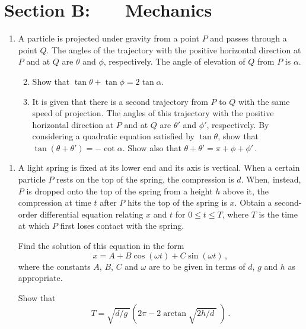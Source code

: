 \documentclass[a4, 11pt]{report}
\newlength{\qspace}
\newcounter{qnumber}
\newenvironment{question}%
 {\vspace{\qspace}
  \begin{enumerate}[\bfseries 1\quad][10]%
    \setcounter{enumi}{\value{qnumber}}%
    \item%
 }
{
  \end{enumerate}
  \filbreak
  \stepcounter{qnumber}
 }
\newenvironment{questionparts}[1][1]%
 {
  \begin{enumerate}[\bfseries (i)]%
    \setcounter{enumii}{#1}
    \addtocounter{enumii}{-1}
    \setlength{\itemsep}{5mm}
    \setlength{\parskip}{8pt}
 }
 {
  \end{enumerate}
 }
\def\le{\leqslant}
\begin{document}
		
	
\newpage
\section*{Section B: \ \ \ Mechanics}


	
\begin{question}
A particle is projected under gravity from a point $P$ and passes
through a point $Q$. The angles of the trajectory with the positive
horizontal direction at $P$ and at $Q$ are $\theta$ and $\phi$,
respectively. The angle of elevation   of $Q$ from $P$ is $\alpha$.

\begin{questionparts}
\item Show that $\tan\theta +\tan\phi = 2\tan\alpha$.

\item It is given that there is a second trajectory from $P$ to $Q$
with the same speed of projection.
The angles of this trajectory with the positive
 horizontal direction at $P$ and at $Q$ are $\theta'$ and $\phi'$,
 respectively.
By considering a quadratic
equation satisfied by $\tan\theta$,
show that  $\tan(\theta+\theta') = -\cot\alpha$.
Show also that $\theta+\theta'=\pi+\phi+\phi'\,$.
\end{questionparts}
	\end{question}
	
\begin{question}
A light spring is fixed at its lower end and its axis is
vertical. When  a certain particle $P$ rests on the top of the 
spring, the compression is $d$. When, instead, $P$ is dropped onto the 
top of the spring from a
height $h$ above it, the compression at time $t$ after $P$ hits the
top of the spring is $x$. Obtain    a second-order differential
equation relating $x$ and $t$ for $0\le t \le T$, where $T$ is the time
at which $P$ first loses contact with the spring.

Find        the  solution of this equation in    the form
\[
x= A +  B\cos (\omega t) + C\sin(\omega t)\,,
\]
where the constants $A$, $B$, $C$ and $\omega$ are to be given in terms
of $d$, $g$ and $h$ as appropriate.  

Show that 
\[
T 
= \sqrt{d/g\;} \left (2 \pi - 2 \arctan
\sqrt{2h/d\;}\;\right)\,.
\]
\end{question}

\end{document}
